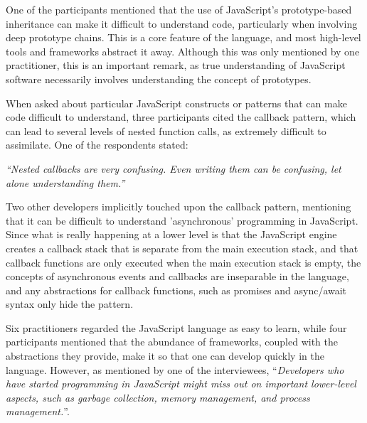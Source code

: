 One of the participants mentioned that the use of JavaScript's prototype-based inheritance can make it difficult to understand code, particularly when involving  deep prototype chains. This is a core feature of the language, and most high-level tools and frameworks abstract it away. Although this was only mentioned by one practitioner, this is an important remark, as true understanding of JavaScript software necessarily involves understanding the concept of prototypes.


When asked about particular JavaScript constructs or patterns that can make code difficult to understand, three participants cited the callback pattern, which can lead to several levels of nested function calls, as extremely difficult to assimilate. One of the respondents stated:

\begin{mq}
\emph{``Nested callbacks are very confusing. Even writing them can be confusing, let alone understanding them.''}
\end{mq}

Two other developers implicitly touched upon the callback pattern, mentioning that it can be difficult to understand 'asynchronous' programming in JavaScript. Since what is really happening at a lower level is that the JavaScript engine creates a callback stack that is separate from the main execution stack, and that callback functions are only executed when the main execution stack is empty, the concepts of asynchronous events and callbacks are inseparable in the language, and any abstractions for callback functions, such as promises and async/await syntax only hide the pattern.



Six practitioners regarded the JavaScript language as easy to learn, while four
participants mentioned that the abundance of frameworks,
coupled with the abstractions they provide, make it so that one
can develop quickly in the language. However, as mentioned by one
of the interviewees, ``\emph{Developers who have started
programming in JavaScript might miss out on important lower-level
aspects, such as garbage collection, memory management,
and process management.}''. 


